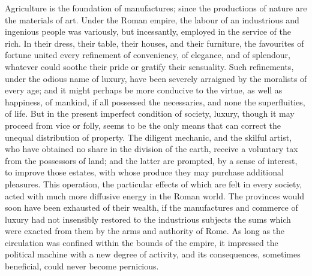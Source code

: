 Agriculture is the foundation of manufactures; since the productions of nature are the materials of art. Under the Roman empire, the labour of an industrious and ingenious people was variously, but incessantly, employed in the service of the rich. In their dress, their table, their houses, and their furniture, the favourites of fortune united every refinement of conveniency, of elegance, and of splendour, whatever could soothe their pride or gratify their sensuality. Such refinements, under the odious name of luxury, have been severely arraigned by the moralists of every age; and it might perhaps be more conducive to the virtue, as well as happiness, of mankind, if all possessed the necessaries, and none the superfluities, of life. But in the present imperfect condition of society, luxury, though it may proceed from vice or folly, seems to be the only means that can correct the unequal distribution of property. The diligent mechanic, and the skilful artist, who have obtained no share in the division of the earth, receive a voluntary tax from the possessors of land; and the latter are prompted, by a sense of interest, to improve those estates, with whose produce they may purchase additional pleasures. This operation, the particular effects of which are felt in every society, acted with much more diffusive energy in the Roman world. The provinces would soon have been exhausted of their wealth, if the manufactures and commerce of luxury had not insensibly restored to the industrious subjects the sums which were exacted from them by the arms and authority of Rome. As long as the circulation was confined within the bounds of the empire, it impressed the political machine with a new degree of activity, and its consequences, sometimes beneficial, could never become pernicious.

